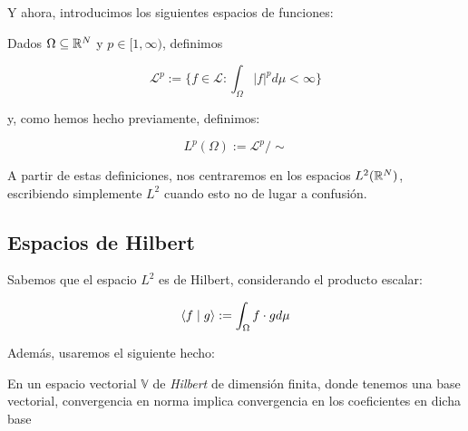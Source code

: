 Y ahora, introducimos los siguientes espacios de funciones:

\begin{definicion}
    Dados $\Omega \subseteq \mathbb{R}^N$ y $p \in [1, \infty)$, definimos

    \begin{equation}
        \mathcal{L}^p := \{ f \in \mathcal{L} : \int_{\Omega} |f|^p d\mu < \infty \}
    \end{equation}

    y, como hemos hecho previamente, definimos:

    \begin{equation}
        L^p(\Omega) := \mathcal{L}^p / \sim
    \end{equation}

\end{definicion}

A partir de estas definiciones, nos centraremos en los espacios $L^2(\mathbb{R}^N)$, escribiendo simplemente $L^2$ cuando esto no de lugar a confusión.

\subsection{Espacios de Hilbert}

Sabemos que el espacio $L^2$ es de Hilbert, considerando el producto escalar:

\begin{equation}
    \langle f \; | \; g \rangle := \int_{\Omega} f \cdot g d\mu
\end{equation}

Además, usaremos el siguiente hecho:

\begin{proposicion} \label{prop:convergencia_norma_coeficientes}
    En un espacio vectorial $\mathbb{V}$ de \textit{Hilbert} de dimensión finita, donde tenemos una base vectorial, convergencia en norma implica convergencia en los coeficientes en dicha base
\end{proposicion}


